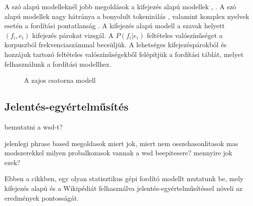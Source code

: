 A szó alapú modelleknél jobb megoldások a kifejezés alapú modellek \cite{Marcu:2002}, \cite{Och99improvedalignment}. A szó alapú modellek nagy hátránya a bonyolult tokenizálás \cite{Lopez07asurvey}, valamint komplex nyelvek esetén a fordítási pontatlanság \cite{Lopez07asurvey}. A kifejezés alapú modell a szavak helyett $(f_i, e_i)$ kifejezés párokat vizsgál. A $P(f_i|e_i)$ feltételes valószínűséget a korpuszból frekvenciaszámmal becsüljük. A lehetséges kifejezéspárokból és hozzájuk tartozó feltételes valószínűségekből felépítjük a fordítási táblát, melyet felhasználunk a fordítási modellhez.










\begin{figure}[b]
  	\centering
  	\caption[smt_translation_model]%
  	{A zajos csatorna modell}
 	\label{fig:modell:fig1}
\end{figure}





\subsection{Jelentés-egyértelműsítés}
bemutatni a wsd-t?

jelenlegi phrase based megoldasok
	miert jok, miert nem
	osszehasonlitasok mas modszerekkel
milyen probalkozasok vannak a wsd beepitesere?
mennyire jok ezek?


Ebben a cikkben, egy olyan statisztikus gépi fordító modellt mutatunk be, mely kifejezés alapú és a Wikipédiát felhasználva jelentés-egyértelműsítéssel növeli az eredmények pontosságát.